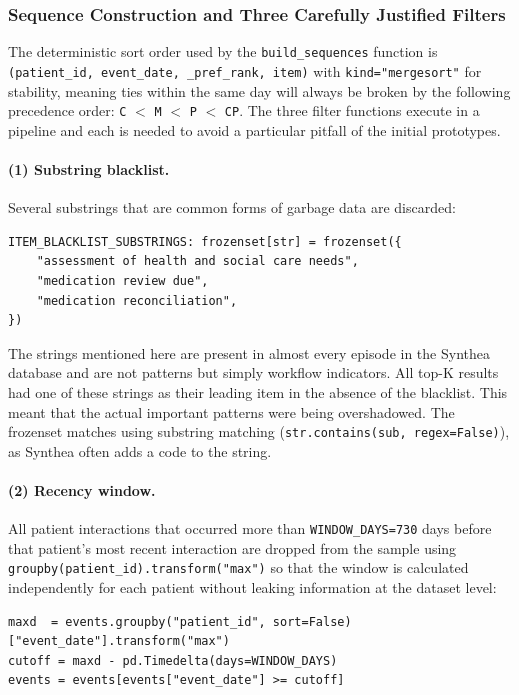 \subsubsection*{Sequence Construction and Three Carefully Justified Filters}

The deterministic sort order used by the \texttt{build\_sequences} function is \texttt{(patient\_id, event\_date, \_pref\_rank, item)} with \texttt{kind="mergesort"} for stability, meaning ties within the same day will always be broken by the following precedence order: \texttt{C} \(<\) \texttt{M} \(<\) \texttt{P} \(<\) \texttt{CP}. The three filter functions execute in a pipeline and each is needed to avoid a particular pitfall of the initial prototypes.

\paragraph{(1) Substring blacklist.} Several substrings that are common forms of garbage data are discarded:

\begin{lstlisting}[style=pythonstyle]
ITEM_BLACKLIST_SUBSTRINGS: frozenset[str] = frozenset({
    "assessment of health and social care needs",
    "medication review due",
    "medication reconciliation",
})
\end{lstlisting}

\noindent The strings mentioned here are present in almost every episode in the Synthea database and are not patterns but simply workflow indicators. All top-K results had one of these strings as their leading item in the absence of the blacklist. This meant that the actual important patterns were being overshadowed. The frozenset matches using substring matching (\texttt{str.contains(sub, regex=False)}), as Synthea often adds a code to the string.

\paragraph{(2) Recency window.} All patient interactions that occurred more than \texttt{WINDOW\_DAYS=730} days before that patient's most recent interaction are dropped from the sample using \texttt{groupby(patient\_id).transform("max")} so that the window is calculated independently for each patient without leaking information at the dataset level:

\begin{lstlisting}[style=pythonstyle]
maxd  = events.groupby("patient_id", sort=False)["event_date"].transform("max")
cutoff = maxd - pd.Timedelta(days=WINDOW_DAYS)
events = events[events["event_date"] >= cutoff]
\end{lstlisting}


